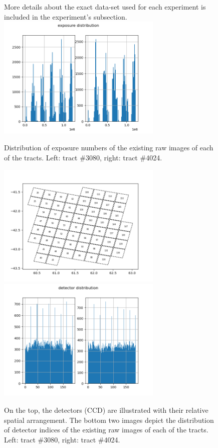 \documentclass[DM,authoryear,toc]{lsstdoc}
\begin{document}
\begin{figure}[h]
More details about the exact data-set used for each experiment is included in the experiment's subsection.
  \centering
  \includegraphics[width=0.7\textwidth]{exposure_hist.png}
  \caption{Distribution of exposure numbers of the existing raw images of each of the tracts. Left: tract \#3080, right: tract \#4024.}
  \label{fig:exposure_hist}
\end{figure}

\begin{figure}[h]
  \centering
  \includegraphics[width=0.7\textwidth]{tract_detectors.png}
  \includegraphics[width=0.7\textwidth]{detector_hist.png}
  \caption{On the top, the detectors (CCD) are illustrated with their relative spatial arrangement. The bottom two images depict the distribution of detector indices of the existing raw images of each of the tracts. Left: tract \#3080, right: tract \#4024.}
  \label{fig:detector_hist}
\end{figure}
\end{document}
